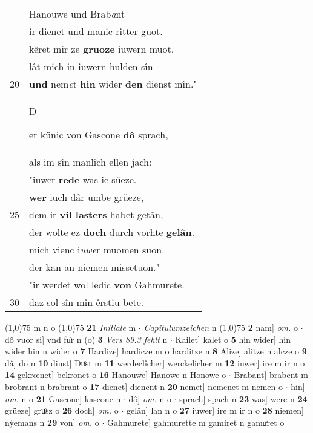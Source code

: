 \documentclass[8pt,a4paper,notitlepage]{article}
\begin{document}
\begin{table}[ht]
\begin{minipage}[t]{0.5\linewidth}
\begin{tabular}{rl}
 & Hanouwe und Brab\textit{a}nt\\ 
 & ir dienet und manic ritter guot.\\ 
 & kêret mir ze \textbf{gruoze} iuwern muot.\\ 
 & lât mich in iuwern hulden sîn\\ 
20 & \textbf{und} nem\textit{e}t \textbf{hin} wider \textbf{den} dienst mîn."\\ 
 & \begin{large}D\end{large}er künic von Gascone \textbf{dô} sprach,\\ 
 & als im sîn manlîch ellen jach:\\ 
 & "iuwer \textbf{rede} was ie süeze.\\ 
 & \textbf{wer} iuch dâr umbe grüeze,\\ 
25 & dem ir \textbf{vil lasters} habet getân,\\ 
 & der wolte ez \textbf{doch} durch vorhte \textbf{gelân}.\\ 
 & mich vienc i\textit{uwe}r muomen suon.\\ 
 & der kan an niemen missetuon."\\ 
 & "ir werdet wol ledic \textbf{von} Gahmurete.\\ 
30 & daz sol sîn mîn êrstiu bete.\\ 
\end{tabular}
\scriptsize
\line(1,0){75} \newline
m n o \newline
\line(1,0){75} \newline
\textbf{21} \textit{Initiale} m   $\cdot$ \textit{Capitulumzeichen} n  \newline
\line(1,0){75} \newline
\textbf{2} nam] \textit{om.} o  $\cdot$ dô vuor si] vnd fuͦr n (o) \textbf{3} \textit{Vers 89.3 fehlt} n   $\cdot$ Kailet] kalet o \textbf{5} hin wider] hin wider hin n wider o \textbf{7} Hardize] hardicze m o harditze n \textbf{8} Alize] alitze n alcze o \textbf{9} dâ] do n \textbf{10} diust] Duͦst m \textbf{11} werdeclîcher] werckelicher m \textbf{12} iuwer] ire m ir n o \textbf{14} gekrœnet] bekronet o \textbf{16} Hanouwe] Hanowe n Honowe o  $\cdot$ Brabant] brabent m brobrant n brabrant o \textbf{17} dienet] dienent n \textbf{20} nemet] nemenet m nemen o  $\cdot$ hin] \textit{om.} n o \textbf{21} Gascone] kascone n  $\cdot$ dô] \textit{om.} n o  $\cdot$ sprach] spach n \textbf{23} was] were n \textbf{24} grüeze] gruͦsz o \textbf{26} doch] \textit{om.} o  $\cdot$ gelân] lan n o \textbf{27} iuwer] ire m ir n o \textbf{28} niemen] nẏemans n \textbf{29} von] \textit{om.} o  $\cdot$ Gahmurete] gahmurette m gamiret n gamuͯret o \newline
\end{minipage}
\end{table}
\end{document}
